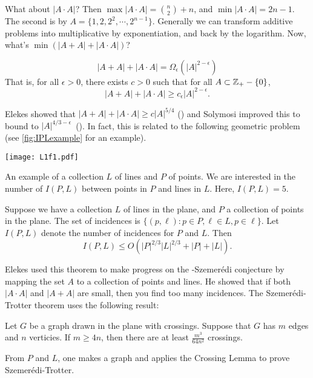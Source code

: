 What about $|A\cdot A|$? Then $\max |A\cdot A| = {n\choose 2} +n$, and $\min |A\cdot A| = 2n-1$. The second is by $A = \{1,2,2^2,\dotsm, 2^{n-1}\}$. Generally we can transform additive problems into multiplicative by exponentiation, and back by the logarithm.
Now, what's $\min ( |A+A| + |A\cdot A|)$? 
\begin{conjecture*} 
\[
|A+A| + |A\cdot A| = \Omega_\epsilon (|A|^{2-\epsilon})
\]
That is, for all $\epsilon>0$, there exists $c>0$ such that for all $A\subset \mathbb{Z}_+ - \{0\}$,
\[
|A + A| + |A\cdot A| \geq c_\epsilon |A|^{2- \epsilon}.
\]
\end{conjecture*}
Elekes showed that $|A +A| + |A\cdot A| \geq c |A|^{5/4}$ (\cite{elekes1997number}) and Solymosi improved this to bound to  $|A|^{4/3 - \epsilon}$~(\cite{Solymosi2009}).
In fact, this is related to the following geometric problem (see \cref{fig:IPLexample} for an example).
\begin{theorem*} 
\begin{marginfigure}[2cm]
\texttt{[image: L1f1.pdf]}
\caption{An example of a collection $L$ of lines and $P$ of points. We are interested in the number of  $I(P,L)$ between points in $P$ and lines in $L$. Here, $I(P,L) = 5$.} \label{fig:IPLexample}
\end{marginfigure}
Suppose we have a collection $L$ of lines in the plane, and $P$ a collection of points in the plane. The set of incidences is $\{(p,\ell): p\in P, \ell\in L, p\in \ell\}$.   Let $I(P,L)$ denote the number of incidences for $P$ and $L$. Then
\[ 
I(P,L) \leq O ( |P|^{2/3} |L|^{2/3} + |P| + |L| ).
\]
\end{theorem*}
Elekes used this theorem to make progress on the \erdos-Szemer\'edi conjecture by mapping the set $A$ to a collection of points and lines. He showed that if both $|A\cdot A|$ and $|A+A|$ are small, then you find too many incidences.
The Szemer\'edi-Trotter theorem uses the following result:
\begin{lemma*}
Let $G$ be a graph drawn in the plane with crossings. Suppose that $G$ has $m$ edges and $n$ verticies. If $m\geq 4n$, then there are at least $\frac{m^3}{64 n^2}$ crossings.
\end{lemma*}
From $P$ and $L$, one makes a graph and applies the Crossing Lemma to prove Szemer\'edi-Trotter.
